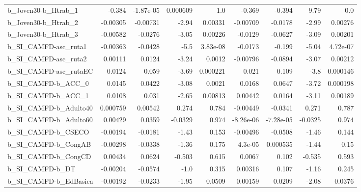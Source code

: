 \begin{tabular}{lrrrrrrrr}
b\_Joven30-b\_Htrab\_1        &      -0.384 &    -1.87e-05 &  0.000609 &      1.0 &     -0.369 &      -0.394 &         9.79 &           0.0 \\
b\_Joven30-b\_Htrab\_2        &    -0.00305 &     -0.00731 &     -2.94 &  0.00331 &   -0.00709 &     -0.0178 &        -2.99 &       0.00276 \\
b\_Joven30-b\_Htrab\_3        &    -0.00582 &      -0.0276 &     -3.05 &  0.00226 &    -0.0129 &     -0.0627 &        -3.09 &       0.00201 \\
b\_SI\_CAMFD-asc\_ruta1       &    -0.00363 &      -0.0428 &      -5.5 & 3.83e-08 &    -0.0173 &      -0.199 &        -5.04 &      4.72e-07 \\
b\_SI\_CAMFD-asc\_ruta2       &     0.00111 &       0.0124 &     -3.24 &   0.0012 &   -0.00796 &     -0.0894 &        -3.07 &       0.00212 \\
b\_SI\_CAMFD-asc\_rutaEC      &      0.0124 &        0.059 &     -3.69 & 0.000221 &      0.021 &       0.109 &         -3.8 &      0.000146 \\
b\_SI\_CAMFD-b\_ACC\_0         &      0.0145 &       0.0422 &     -3.08 &   0.0021 &     0.0168 &      0.0647 &        -3.72 &      0.000198 \\
b\_SI\_CAMFD-b\_ACC\_1         &      0.0108 &        0.031 &     -2.65 &  0.00813 &    0.00442 &      0.0164 &        -3.11 &       0.00189 \\
b\_SI\_CAMFD-b\_Adulto40      &    0.000759 &      0.00542 &     0.274 &    0.784 &   -0.00449 &     -0.0341 &        0.271 &         0.787 \\
b\_SI\_CAMFD-b\_Adulto60      &     0.00429 &       0.0359 &   -0.0329 &    0.974 &  -8.26e-06 &   -7.28e-05 &      -0.0325 &         0.974 \\
b\_SI\_CAMFD-b\_CSECO         &    -0.00194 &      -0.0181 &     -1.43 &    0.153 &   -0.00496 &     -0.0508 &        -1.46 &         0.144 \\
b\_SI\_CAMFD-b\_CongAB        &    -0.00298 &      -0.0338 &     -1.36 &    0.175 &    4.3e-05 &    0.000535 &        -1.44 &          0.15 \\
b\_SI\_CAMFD-b\_CongCD        &     0.00434 &       0.0624 &    -0.503 &    0.615 &     0.0067 &       0.102 &       -0.535 &         0.593 \\
b\_SI\_CAMFD-b\_DT            &    -0.00204 &      -0.0574 &      -1.0 &    0.315 &    0.00316 &       0.107 &        -1.16 &         0.245 \\
b\_SI\_CAMFD-b\_EdBasica      &    -0.00192 &      -0.0233 &     -1.95 &   0.0509 &    0.00159 &      0.0209 &        -2.08 &        0.0376 \\

\end{tabular}
